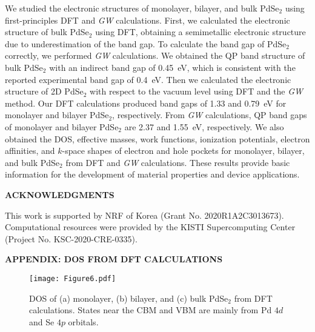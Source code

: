 \documentclass[aps,prb,longbibliography,twocolumn]{revtex4-2}
\begin{document}
We studied the electronic structures of 
monolayer, bilayer, and bulk PdSe$_2$ using first-principles 
DFT and {\em GW} calculations. 
First, we calculated the electronic structure of bulk PdSe$_2$ using DFT, 
obtaining a semimetallic electronic structure due to underestimation 
of the band gap. To calculate the band gap of PdSe$_2$ correctly, 
we performed {\em GW} calculations. We obtained the QP band structure of bulk 
PdSe$_2$ with an indirect band gap of 0.45~eV, which is consistent with 
the reported experimental band gap of 0.4~eV.
Then we calculated the electronic structure of 2D PdSe$_2$ with respect to the vacuum level using DFT and the {\em GW} method.
Our DFT calculations produced band gaps of 1.33 and 0.79~eV for monolayer 
and bilayer PdSe$_2$, respectively. From {\em GW} calculations, 
QP band gaps of monolayer and bilayer PdSe$_2$ are 2.37 and 1.55~eV, 
respectively.
We also obtained the DOS, effective masses, work functions, ionization potentials, electron affinities, and $k$-space shapes of electron and hole pockets for monolayer, bilayer, and bulk PdSe$_2$ from DFT and {\em GW} calculations. These results provide basic information for the development of material properties and device applications.
\\


\begin{center}
{\bf ACKNOWLEDGMENTS}\\
\end{center}

This work is supported by NRF of Korea (Grant No. 2020R1A2C3013673). 
Computational resources were provided by the KISTI Supercomputing 
Center (Project No. KSC-2020-CRE-0335).\\


\appendix

\begin{center}
{\bf APPENDIX: DOS FROM DFT CALCULATIONS}
\\
\end{center}

\begin{figure}[b]
\texttt{[image: Figure6.pdf]}
\caption{\label{fig6pdse2}DOS of (a) monolayer, (b) bilayer, 
and (c) bulk PdSe$_2$ from DFT calculations. 
States near the CBM and VBM are mainly from Pd $4d$ and Se $4p$ orbitals. }
\end{figure}
\end{document}

